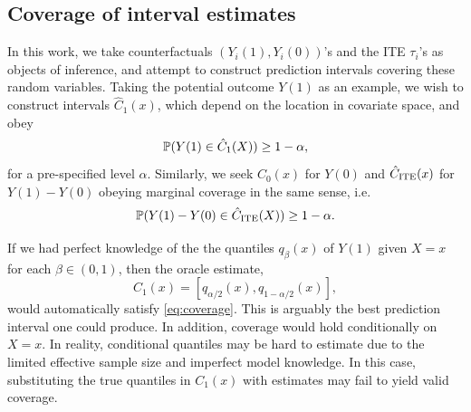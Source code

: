 \subsection{Coverage of interval estimates}
In this work, we take counterfactuals $(Y_{i}(1), Y_{i}(0))$'s and the
ITE $\tau_{i}$'s as objects of inference, and attempt to construct
prediction intervals covering these random variables. Taking the
potential outcome $Y(1)$ as an example, we wish to construct intervals
$\hat{C}_{1}(x)$, which depend on the location in covariate space,  and
obey
\begin{equation}
  \label{eq:coverage}
  \P(Y(1) \in \hat{C}_{1}(X))\ge 1 - \alpha,
\end{equation}
for a pre-specified level $\alpha$. 
Similarly, we seek $\hat{C}_{0}(x)$ for $Y(0)$ and $\CITE(x)$
for $Y(1) - Y(0)$ obeying marginal coverage in the same sense, i.e.
\begin{equation}
  \label{eq:covITE}
   \P(Y(1) - Y(0) \in \CITE(X))\ge 1 - \alpha. 
\end{equation}

If we had perfect knowledge of the the quantiles $q_{\beta}(x)$ of
$Y(1)$ given $X = x$ for each $\beta\in (0, 1)$, then the oracle
estimate, 
\[
{C}_{1}(x) = [q_{\alpha / 2}(x), q_{1 - \alpha / 2}(x)],
\]
would automatically satisfy \eqref{eq:coverage}. This is arguably the
best prediction interval one could produce. In addition, coverage
would hold conditionally on $X = x$. In reality, conditional quantiles may
be hard to estimate due to the limited effective sample size and
imperfect model knowledge. In this case, substituting the true
quantiles in $C_1(x)$ with estimates may fail to yield valid coverage.

